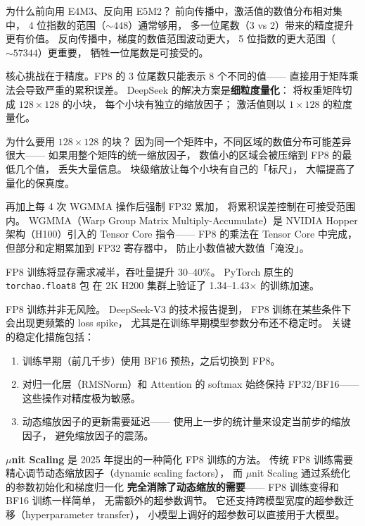 为什么前向用 E4M3、反向用 E5M2？
前向传播中，激活值的数值分布相对集中，
4 位指数的范围（$\sim 448$）通常够用，
多一位尾数（3 vs 2）带来的精度提升更有价值。
反向传播中，梯度的数值范围波动更大，
5 位指数的更大范围（$\sim 57344$）更重要，
牺牲一位尾数是可接受的。

核心挑战在于精度。FP8 的 3 位尾数只能表示 8 个不同的值——
直接用于矩阵乘法会导致严重的累积误差。
DeepSeek 的解决方案是\textbf{细粒度量化}：
将权重矩阵切成 $128 \times 128$ 的小块，
每个小块有独立的缩放因子；
激活值则以 $1 \times 128$ 的粒度量化。

为什么要用 $128 \times 128$ 的块？
因为同一个矩阵中，不同区域的数值分布可能差异很大——
如果用整个矩阵的统一缩放因子，
数值小的区域会被压缩到 FP8 的最低几个值，
丢失大量信息。
块级缩放让每个小块有自己的「标尺」，
大幅提高了量化的保真度。

再加上每 4 次 WGMMA 操作后强制 FP32 累加，
将累积误差控制在可接受范围内。
WGMMA（Warp Group Matrix Multiply-Accumulate）是
NVIDIA Hopper 架构（H100）引入的 Tensor Core 指令——
FP8 的乘法在 Tensor Core 中完成，
但部分和定期累加到 FP32 寄存器中，
防止小数值被大数值「淹没」。

FP8 训练将显存需求减半，吞吐量提升 30--40\%。
PyTorch 原生的 \texttt{torchao.float8} 包
在 2K H200 集群上验证了 1.34--1.43$\times$ 的训练加速。

\begin{warnbox}[FP8 训练的稳定性挑战]
FP8 训练并非无风险。
DeepSeek-V3 的技术报告提到，
FP8 训练在某些条件下会出现更频繁的 loss spike，
尤其是在训练早期模型参数分布还不稳定时。
关键的稳定化措施包括：
\begin{enumerate}[noitemsep]
  \item 训练早期（前几千步）使用 BF16 预热，之后切换到 FP8。
  \item 对归一化层（RMSNorm）和 Attention 的 softmax
        始终保持 FP32/BF16——这些操作对精度极为敏感。
  \item 动态缩放因子的更新需要延迟——
        使用上一步的统计量来设定当前步的缩放因子，
        避免缩放因子的震荡。
\end{enumerate}
\end{warnbox}

\textbf{$\mu$nit Scaling} 是 2025 年提出的一种简化 FP8 训练的方法。%
传统 FP8 训练需要精心调节动态缩放因子（dynamic scaling factors），
而 $\mu$nit Scaling 通过系统化的参数初始化和梯度归一化
\textbf{完全消除了动态缩放的需要}——
FP8 训练变得和 BF16 训练一样简单，
无需额外的超参数调节。
它还支持跨模型宽度的超参数迁移（hyperparameter transfer），
小模型上调好的超参数可以直接用于大模型。

